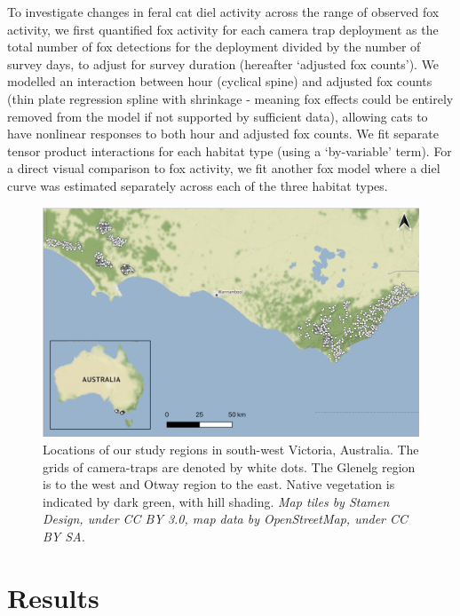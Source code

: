 \documentclass[11pt,a4paper,titlepage,twoside,openright]{style/unimelbthesis}
\begin{document}
\begin{mainmatter}
To investigate changes in feral cat diel activity across the range of observed fox activity, we first quantified fox activity for each camera trap deployment as the total number of fox detections for the deployment divided by the number of survey days, to adjust for survey duration (hereafter `adjusted fox counts'). We modelled an interaction between hour (cyclical spine) and adjusted fox counts (thin plate regression spline with shrinkage - meaning fox effects could be entirely removed from the model if not supported by sufficient data), allowing cats to have nonlinear responses to both hour and adjusted fox counts. We fit separate tensor product interactions for each habitat type (using a `by-variable' term). For a direct visual comparison to fox activity, we fit another fox model where a diel curve was estimated separately across each of the three habitat types.

\newpage
\begin{figure}

{\centering \includegraphics[width=1\linewidth]{figure/map_cams} 

}

\caption{Locations of our study regions in south-west Victoria, Australia. The grids of camera-traps are denoted by white dots. The Glenelg region is to the west and Otway region to the east. Native vegetation is indicated by dark green, with hill shading. \textit{Map tiles by Stamen Design, under CC BY 3.0, map data by OpenStreetMap, under CC BY SA.}}\label{fig:diel-map}
\end{figure}
\newpage

\hypertarget{results-3}{%
\section{Results}\label{results-3}}


\end{mainmatter}
\end{document}
